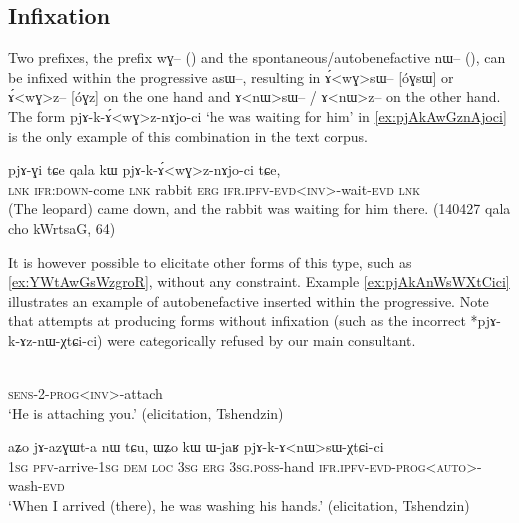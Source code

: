 \documentclass[oldfontcommands,oneside,a4paper,11pt]{article}
\newcommand{\ipa}[1]{{\phon \mbox{#1}}} %
\begin{document}
\subsection{Infixation}
Two prefixes, the prefix \ipa{wɣ--} (\citealt{jacques10inverse}) and the spontaneous/autobenefactive \ipa{nɯ--}  (\citealt{jacques15spontaneous}), can be infixed within the progressive \ipa{asɯ--}, resulting in \ipa{ɤ́<wɣ>sɯ--} [\ipa{óɣsɯ}] or \ipa{ɤ́<wɣ>z--} [\ipa{óɣz}] on the one hand and  \ipa{ɤ<nɯ>sɯ--} / \ipa{ɤ<nɯ>z--} on the other hand. The form \ipa{pjɤ-k-ɤ́<wɣ>z-nɤjo-ci} `he was waiting for him' in \ref{ex:pjAkAwGznAjoci} is the only example of this combination in the text corpus.


\begin{exe}
\ex \label{ex:pjAkAwGznAjoci}
\gll \ipa{tɕe} 	\ipa{pjɤ-ɣi} 	\ipa{tɕe} 	\ipa{qala} 	\ipa{kɯ} 	\ipa{pjɤ-k-ɤ́<wɣ>z-nɤjo-ci} 	\ipa{tɕe,} \\
\textsc{lnk} \textsc{ifr:down}-come \textsc{lnk} rabbit \textsc{erg} \textsc{ifr.ipfv-evd<inv>}-wait-\textsc{evd} \textsc{lnk} \\
\glt (The leopard) came down, and the rabbit was waiting for him there. (140427 qala cho kWrtsaG, 64)
\end{exe}

It is however possible to elicitate other forms of this type, such as \ref{ex:YWtAwGsWzgroR}, without any constraint. Example \ref{ex:pjAkAnWsWXtCici} illustrates an example of autobenefactive inserted within the progressive. Note that attempts at producing forms without infixation (such as the incorrect *\ipa{pjɤ-k-ɤz-nɯ-χtɕi-ci}) were categorically refused by our main consultant.

\begin{exe}
\ex  \label{ex:YWtAwGsWzgroR}
\gll  \ipa{ɲɯ-tɯ-ɤ́<wɣ>sɯ-zgroʁ}    \\
\textsc{sens-2-prog<inv>}-attach \\
\glt `He is attaching you.' (elicitation, Tshendzin)
\end{exe}

\begin{exe}
\ex  \label{ex:pjAkAnWsWXtCici}
\gll
\ipa{aʑo}  	\ipa{jɤ-azɣɯt-a}  	\ipa{nɯ} \ipa{tɕu,}  	\ipa{ɯʑo}  	\ipa{kɯ}  	\ipa{ɯ-jaʁ}  	\ipa{pjɤ-k-ɤ<nɯ>sɯ-χtɕi-ci}  \\
 \textsc{1sg} \textsc{pfv}-arrive-\textsc{1sg} \textsc{dem} \textsc{loc} \textsc{3sg} \textsc{erg} \textsc{3sg.poss}-hand \textsc{ifr.ipfv-evd-prog<auto>}-wash-\textsc{evd} \\
\glt `When I arrived (there), he was washing his hands.' (elicitation, Tshendzin)
\end{exe}
\end{document}

